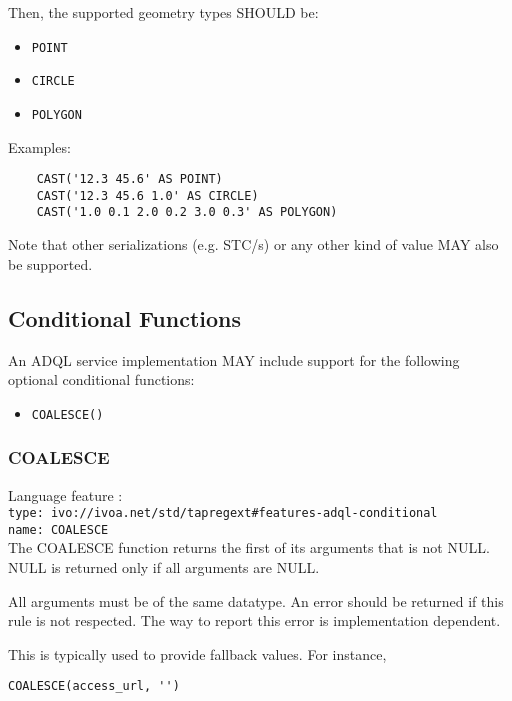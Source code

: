 \documentclass[11pt,a4paper]{ivoa}
\begin{document}
Then, the supported geometry types SHOULD be:

\begin{itemize}
    \item \verb:POINT:
    \item \verb:CIRCLE:
    \item \verb:POLYGON:
\end{itemize}

Examples:

\begin{verbatim}
    CAST('12.3 45.6' AS POINT)
    CAST('12.3 45.6 1.0' AS CIRCLE)
    CAST('1.0 0.1 2.0 0.2 3.0 0.3' AS POLYGON)
\end{verbatim}

Note that other serializations (e.g. STC/s) or any other kind of value MAY also
be supported.

\subsection{Conditional Functions}
\label{sec:condfunc}

An ADQL service implementation MAY include support for the following optional
conditional functions:

\begin{itemize}
    \item \verb:COALESCE():
\end{itemize}

\subsubsection{COALESCE}
{\footnotesize Language feature :}\\
{\footnotesize \verb|type: ivo://ivoa.net/std/tapregext#features-adql-conditional|}\\
{\footnotesize \verb|name: COALESCE|}\\

The COALESCE function returns the first of its arguments that is not
NULL. NULL is returned only if all arguments are NULL.

All arguments must be of the same datatype. An error should be returned
if this rule is not respected. The way to report this error is
implementation dependent.

This is typically used to provide fallback values.  For instance,

\begin{verbatim}
COALESCE(access_url, '')
\end{verbatim}
\end{document}
